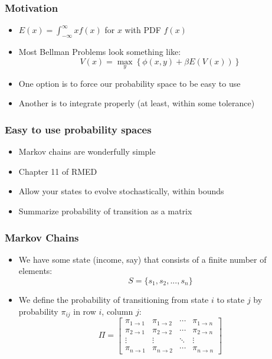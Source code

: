 \documentclass{beamer}
\author{Trevor Gallen}
\date{}
\begin{document}
\begin{frame}
\titlepage
\end{frame}

\begin{frame}
\frametitle[alignment=center]{Motivation}
\begin{itemize}
\item $E(x)=\int_{-\infty}^\infty xf(x)$ for $x$ with PDF $f(x)$
\bigskip
\item Most Bellman Problems look something like:
\bigskip
$$V(x)=\underset{y}{\max}\left\{\phi(x,y)+\beta E(V(x))\right\}$$
\bigskip
\item One option is to force our probability space to be easy to use
\bigskip
\item Another is to integrate properly (at least, within some tolerance)
\end{itemize}
\end{frame}


\begin{frame}
\frametitle[alignment=center]{Easy to use probability spaces}
\begin{itemize}
\item Markov chains are wonderfully simple
\bigskip
\item Chapter 11 of RMED
\bigskip
\item Allow your states to evolve stochastically, within bounds
\bigskip
\item Summarize probability of transition as a matrix
\end{itemize}
\end{frame}

\begin{frame}
\frametitle[alignment=center]{Markov Chains}
\begin{itemize}
\item We have some state (income, say) that consists of a finite number of elements:
\bigskip
$$S=\{s_1,s_2,...,s_n\}$$
\bigskip
\item We define the probability of transitioning from state $i$ to state $j$ by probability $\pi_{ij}$ in row $i$, column $j$:
\bigskip
$$\Pi=\left[\begin{array}{cccc}\pi_{1\rightarrow1} & \pi_{1\rightarrow2} & \cdots & \pi_{1\rightarrow n} \\ 
\pi_{2\rightarrow1} & \pi_{2\rightarrow2} & \cdots & \pi_{2\rightarrow n} \\
\vdots & \vdots & \ddots & \vdots \\
\pi_{n\rightarrow1} & \pi_{n\rightarrow2} & \cdots & \pi_{n\rightarrow n} 
 \end{array}\right]$$
\end{itemize}
\end{frame}
\end{document}
